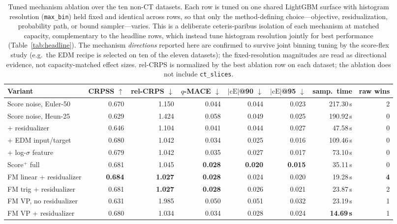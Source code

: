 \documentclass{article}
\begin{document}
\begin{table}[!t]
  \centering
  \caption{Tuned mechanism ablation over the ten non-CT datasets. Each row is tuned on one shared LightGBM surface with histogram resolution (\texttt{max\_bin}) held fixed and identical across rows, so that only the method-defining choice---objective, residualization, probability path, or bound sampler---varies. This is a deliberate ceteris-paribus isolation of each mechanism at matched capacity, complementary to the headline rows, which instead tune histogram resolution jointly for best performance (Table~\ref{tab:headline}). The mechanism \emph{directions} reported here are confirmed to survive joint binning tuning by the score-flex study (e.g.\ the EDM recipe is selected on ten of the eleven datasets); the fixed-resolution magnitudes are read as directional evidence, not capacity-matched effect sizes. rel-CRPS is normalized by the best ablation row on each dataset; the ablation does not include \texttt{ct\_slices}.}\label{tab:mechanism-ablation}
  \scriptsize
  \begin{tabular}{lrrrrrrr}
    \toprule
    Variant & CRPSS $\uparrow$ & rel-CRPS $\downarrow$ & $q$-MACE $\downarrow$ & $|\text{cE}|$@90 $\downarrow$ & $|\text{cE}|$@95 $\downarrow$ & samp.\ time & raw wins \\
    \midrule
    Score noise, Euler-50 & 0.670 & 1.150 & 0.044 & 0.044 & 0.023 & 217.30\,s & 2 \\
    Score noise, Heun-25 & 0.629 & 1.424 & 0.058 & 0.049 & 0.025 & 190.92\,s & 0 \\
    + residualizer & 0.646 & 1.104 & 0.041 & 0.044 & 0.027 & 47.58\,s & 0 \\
    + EDM input/target & 0.680 & 1.042 & 0.034 & 0.025 & 0.016 & 109.46\,s & 0 \\
    + log-$\sigma$ feature & 0.679 & 1.042 & 0.035 & 0.027 & 0.017 & 73.10\,s & 0 \\
    Score$^+$ full & 0.681 & 1.045 & \textbf{0.028} & \textbf{0.020} & \textbf{0.015} & 35.11\,s & 0 \\
    FM linear + residualizer & \textbf{0.684} & \textbf{1.027} & \textbf{0.028} & 0.024 & 0.020 & 19.28\,s & \textbf{4} \\
    FM trig + residualizer & 0.681 & \textbf{1.027} & \textbf{0.028} & 0.026 & 0.021 & 23.87\,s & 2 \\
    FM VP, no residualizer & 0.631 & 1.985 & 0.050 & 0.051 & 0.032 & 23.19\,s & 1 \\
    FM VP + residualizer & 0.680 & 1.034 & 0.034 & 0.028 & 0.024 & \textbf{14.69\,s} & 1 \\
    \bottomrule
  \end{tabular}
\end{table}
\end{document}
